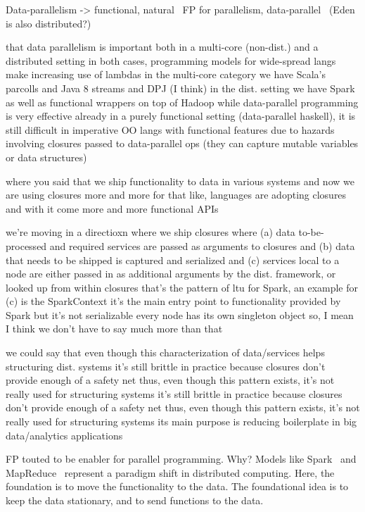 \documentclass{llncs}
\begin{document}
Data-parallelism -> functional, natural~\cite{Nova}
FP for parallelism, data-parallel~\cite{Eden, DataParallelHaskell} (Eden is also distributed?)

that data parallelism is important
both in a multi-core (non-dist.) and a distributed setting
in both cases, programming models for wide-spread langs make increasing use of lambdas
in the multi-core category we have Scala's parcolls and Java 8 streams and DPJ (I think)
in the dist. setting we have Spark as well as functional wrappers on top of Hadoop
while data-parallel programming is very effective already in a purely functional setting (data-parallel haskell), it is still difficult in imperative OO langs with functional features
due to hazards involving closures passed to data-parallel ops
(they can capture mutable variables or data structures)

where you said that we ship functionality to data in various systems
and now we are using closures more and more for that
like, languages are adopting closures and with it come more and more functional APIs

we're moving in a directioxn where we ship closures where (a) data to-be-processed and required services are passed as arguments to closures and (b) data that needs to be shipped is captured and serialized
and  (c) services local to a node are either passed in as additional arguments by the dist. framework, or looked up from within closures
that's the pattern of ltu
for Spark, an example for (c) is the SparkContext
it's the main entry point to functionality provided by Spark
but it's not serializable
every node has its own singleton object
so, I mean I think we don't have to say much more than that

we could say that even though this characterization of data/services helps structuring dist. systems
it's still brittle in practice because closures don't provide enough of a safety net
thus, even though this pattern exists, it's not really used for structuring systems
it's still brittle in practice because closures don't provide enough of a safety net
thus, even though this pattern exists, it's not really used for structuring systems
its main purpose is reducing boilerplate in big data/analytics applications

FP touted to be enabler for parallel programming. Why? 
Models like Spark~\cite{Spark} and MapReduce~\cite{MapReduce} represent a paradigm shift in distributed
computing. Here, the foundation is to move the functionality to the data. The
foundational idea is to keep the data stationary, and to send functions to the
data.
\end{document}
